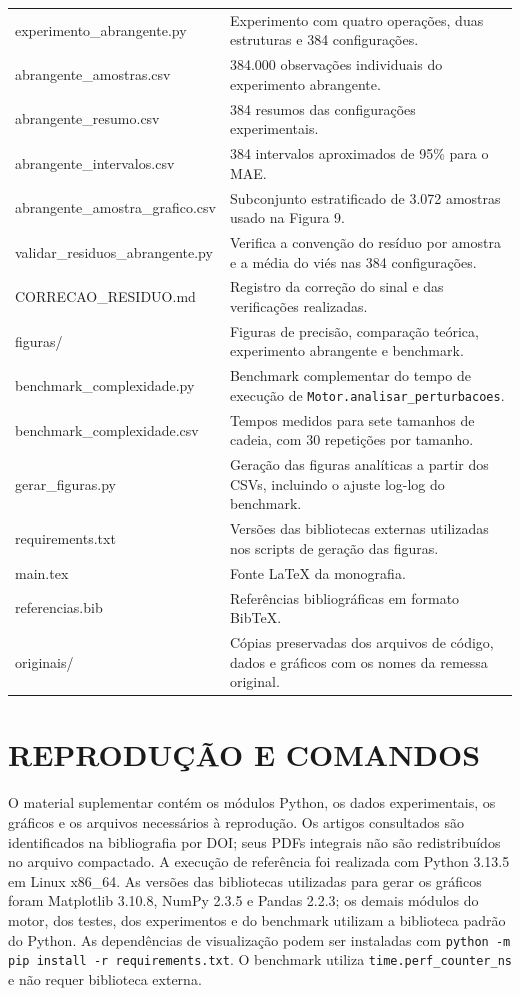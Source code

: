 \documentclass[12pt,openright,oneside,a4paper,brazil]{abntex2}
\newcommand{\arquivo}[1]{\textsf{\small #1}}
\begin{document}
\begin{apendicesenv}
\begin{longtable}{p{}p{}}
\arquivo{experimento\_abrangente.py} & Experimento com quatro operações, duas estruturas e 384 configurações.\\
\arquivo{abrangente\_amostras.csv} & 384.000 observações individuais do experimento abrangente.\\
\arquivo{abrangente\_resumo.csv} & 384 resumos das configurações experimentais.\\
\arquivo{abrangente\_intervalos.csv} & 384 intervalos aproximados de 95\% para o MAE.\\
\arquivo{abrangente\_amostra\_grafico.csv} & Subconjunto estratificado de 3.072 amostras usado na Figura 9.\\
\arquivo{validar\_residuos\_abrangente.py} & Verifica a convenção do resíduo por amostra e a média do viés nas 384 configurações.\\
\arquivo{CORRECAO\_RESIDUO.md} & Registro da correção do sinal e das verificações realizadas.\\
\arquivo{figuras/} & Figuras de precisão, comparação teórica, experimento abrangente e benchmark.\\
\arquivo{benchmark\_complexidade.py} & Benchmark complementar do tempo de execução de \texttt{Motor.analisar\_perturbacoes}.\\
\arquivo{benchmark\_complexidade.csv} & Tempos medidos para sete tamanhos de cadeia, com 30 repetições por tamanho.\\
\arquivo{gerar\_figuras.py} & Geração das figuras analíticas a partir dos CSVs, incluindo o ajuste log-log do benchmark.\\
\arquivo{requirements.txt} & Versões das bibliotecas externas utilizadas nos scripts de geração das figuras.\\
\arquivo{main.tex} & Fonte LaTeX da monografia.\\
\arquivo{referencias.bib} & Referências bibliográficas em formato BibTeX.\\
\arquivo{originais/} & Cópias preservadas dos arquivos de código, dados e gráficos com os nomes da remessa original.\\
\bottomrule
\end{longtable}

\chapter{REPRODUÇÃO E COMANDOS}
O material suplementar contém os módulos Python, os dados experimentais, os gráficos e os arquivos necessários à reprodução. Os artigos consultados são identificados na bibliografia por DOI; seus PDFs integrais não são redistribuídos no arquivo compactado. A execução de referência foi realizada com Python 3.13.5 em Linux x86\_64. As versões das bibliotecas utilizadas para gerar os gráficos foram Matplotlib 3.10.8, NumPy 2.3.5 e Pandas 2.2.3; os demais módulos do motor, dos testes, dos experimentos e do benchmark utilizam a biblioteca padrão do Python. As dependências de visualização podem ser instaladas com \texttt{python -m pip install -r requirements.txt}. O benchmark utiliza \texttt{time.perf\_counter\_ns} e não requer biblioteca externa.


\end{apendicesenv}
\end{document}
